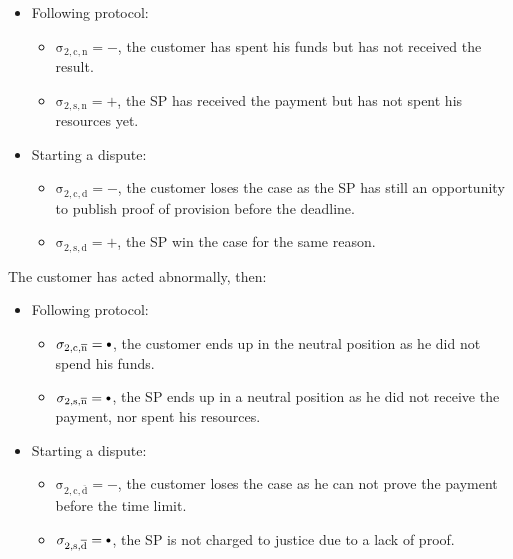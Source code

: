 \documentclass{ieeeaccess}
\newcommand\sbullet[1][.75]{\mathbin{\ThisStyle{\vcenter{\hbox{%
  \scalebox{#1}{$\SavedStyle\bullet$}}}}}%
}
\begin{document}
\begin{itemize}
\item
  Following protocol:
  \begin{itemize}
  \item
    \(\operatorname{\sigma_{2, c, n} = -}\), the customer has spent his funds but has not received the result.
  \item
    \(\operatorname{\sigma_{2, s, n} = +}\), the SP has received the payment but has not spent his resources yet.
  \end{itemize}
\item
  Starting a dispute:

  \begin{itemize}
  \item
    \(\operatorname{\sigma_{2, c, d} = -}\), the customer loses the case as the SP has still an opportunity to publish proof of provision before the deadline.
  \item
    \(\operatorname{\sigma_{2, s, d} = +}\), the SP win the case for the same reason.
  \end{itemize}
\end{itemize}

The customer has acted abnormally, then:

\begin{itemize}
\item
  Following protocol:
  \begin{itemize}
  \item
    \(\operatorname{\sigma_{2, c, \overline{n}} = \sbullet}\), the customer ends up in the neutral position as he did not spend his funds.
  \item
    \(\operatorname{\sigma_{2, s, \overline{n}} = \sbullet}\), the SP ends up in a neutral position as he did not receive the payment, nor spent his resources.
  \end{itemize}
\item
  Starting a dispute:

  \begin{itemize}
  
  \item
    \(\operatorname{\sigma_{2, c, \overline{d}} = -}\), the customer loses the case as he can not prove the payment before the time limit.
  \item
    \(\operatorname{\sigma_{2, s, \overline{d}} = \sbullet}\), the SP is not charged to justice due to a lack of proof.
  \end{itemize}
\end{itemize}
\end{document}
